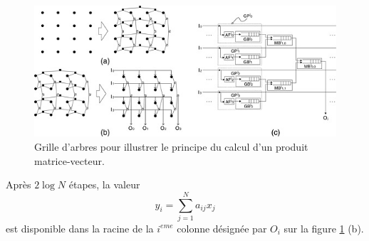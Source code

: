 \begin{figure}[htp]
  \centering
  \includegraphics[width=15cm]{images/gda2}
  \caption{Grille d'arbres pour illustrer le principe du calcul d'un produit matrice-vecteur.}
  \label{fig:gda2}
\end{figure}


Après $2\log N$ étapes, la valeur \[y_i = \sum_{j=1}^{N} a_{ij}x_j\] est disponible dans 
la racine de la $i^{eme}$ colonne désignée par $O_i$ sur la figure \ref{fig:gda2} (b). 
